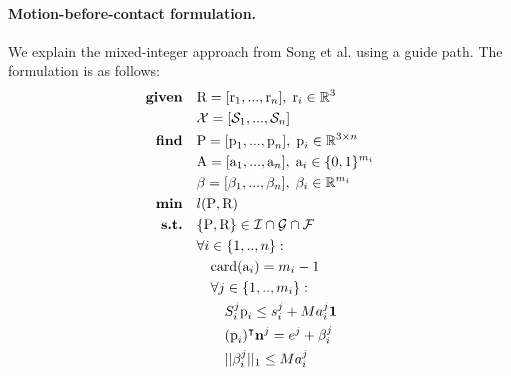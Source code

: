 
\paragraph{Motion-before-contact formulation.\label{par:mip:mbc:formulation}}
We explain the mixed-integer approach from Song et al. \cite{sl1m_v2} using a guide path. 
The formulation is as follows:
\begin{align}
    \textrm{\textbf{given}} \quad & \mbox{R}=[\mbox{r}_1,...,\mbox{r}_n], \; \mbox{r}_i \in \mathbb{R}^{3} \label{eq:mbc:mip_complete:rotation}\\
                            \quad &\mathcal{X}=[\mathcal{S}_1, ..., \mathcal{S}_n] \label{eq:mbc:mip_complete:surf_pruned}\\
    \textrm{\textbf{find}}  \quad & \mbox{P}=[\mbox{p}_1,...,\mbox{p}_n], \;\mbox{p}_i \in \mathbb{R}^{3 \times n} \nonumber\\
                            \quad & \mbox{A}=[\mbox{a}_1,...,\mbox{a}_n], \; \mbox{a}_i \in \{0,1\}^{m_i} \nonumber \\
                            \quad & \beta=[\beta_1,...,\beta_n], \; \beta_i \in \mathbb{R}^{m_i} \nonumber\\
    \textrm{\textbf{min}}  \quad & l(\mbox{P},\mbox{R}) \nonumber\\
    \textrm{\textbf{s.t.}}  \quad & \{\mbox{P},\mbox{R}\} \in \mathcal{I} \cap \mathcal{G} \cap \mathcal{F} \nonumber\\
                            \quad & \forall i \in \{1,..,n\} : \nonumber\\
                                \quad & \quad \mbox{card}(\mbox{a}_i) = m_i-1 \nonumber \\
                                \quad & \quad \forall j \in \{1,..,m_i\} : \label{eq:mbc:mip_complete:surf_cand}\\
                                    \quad & \quad \quad S_i^j\mbox{p}_i \leq s_i^j + M a_i^j \textbf{1}  \nonumber\\
                                    \quad & \quad \quad (\mbox{p}_i)^{\intercal} \textbf{n}^j = e^j + \beta_i^j \nonumber\\
                                    \quad & \quad \quad ||\beta_i^j||_1 \leq M a_i^j \nonumber\\
                                    \nonumber
\end{align}

